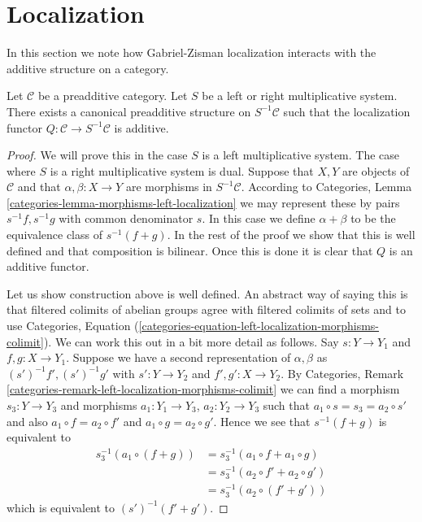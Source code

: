 \section{Localization}
\label{section-localization}

\noindent
In this section we note how Gabriel-Zisman localization interacts with
the additive structure on a category.

\begin{lemma}
\label{lemma-localization-preadditive}
Let $\mathcal{C}$ be a preadditive category.
Let $S$ be a left or right multiplicative system.
There exists a canonical preadditive structure on
$S^{-1}\mathcal{C}$ such that the localization functor
$Q : \mathcal{C} \to S^{-1}\mathcal{C}$ is additive.
\end{lemma}

\begin{proof}
We will prove this in the case $S$ is a left multiplicative system.
The case where $S$ is a right multiplicative system is dual.
Suppose that $X, Y$ are objects of $\mathcal{C}$ and that
$\alpha, \beta : X \to Y$ are morphisms in $S^{-1}\mathcal{C}$. According to
Categories, Lemma \ref{categories-lemma-morphisms-left-localization}
we may represent these by pairs $s^{-1}f, s^{-1}g$ with common denominator
$s$. In this case we define $\alpha + \beta$ to be the equivalence class of
$s^{-1}(f + g)$. In the rest of the proof we show that this is well defined
and that composition is bilinear. Once this is done it is clear that
$Q$ is an additive functor.

\medskip\noindent
Let us show construction above is well defined.
An abstract way of saying this is that filtered colimits of
abelian groups agree with filtered colimits of sets and to use
Categories,
Equation (\ref{categories-equation-left-localization-morphisms-colimit}).
We can work this out in a bit more detail as follows.
Say $s : Y \to Y_1$ and $f, g : X \to Y_1$. Suppose we have a second
representation of $\alpha, \beta$ as $(s')^{-1}f', (s')^{-1}g'$ with
$s' : Y \to Y_2$ and $f', g' : X \to Y_2$. By
Categories, Remark \ref{categories-remark-left-localization-morphisms-colimit}
we can find a morphism $s_3 : Y \to Y_3$ and morphisms
$a_1 : Y_1 \to Y_3$, $a_2 : Y_2 \to Y_3$ such that
$a_1 \circ s = s_3 = a_2 \circ s'$ and also
$a_1 \circ f = a_2 \circ f'$ and $a_1 \circ g = a_2 \circ g'$.
Hence we see that $s^{-1}(f + g)$ is equivalent to
\begin{align*}
s_3^{-1}(a_1 \circ (f + g)) & =
s_3^{-1}(a_1 \circ f + a_1 \circ g) \\
& = s_3^{-1}(a_2 \circ f' + a_2 \circ g') \\
& = s_3^{-1}(a_2 \circ (f' + g'))
\end{align*}
which is equivalent to $(s')^{-1}(f' + g')$.


\end{proof}
